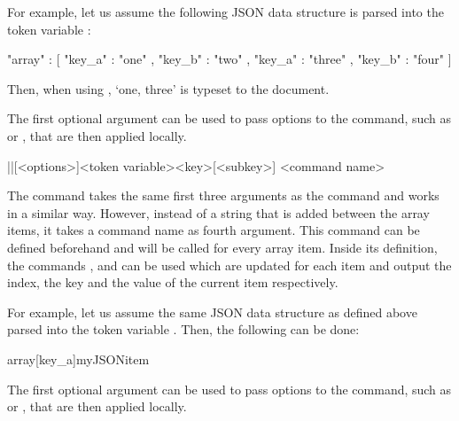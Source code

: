 \documentclass[a4paper]{article}
\begin{document}
{{For example, let us assume the following JSON data structure is parsed into the token variable \macro{\myJSONdata}:

\begin{codeexample}
{
  "array" : [
    {
      "key_a" : "one" ,
      "key_b" : "two"
    } ,
    {
      "key_a" : "three" ,
      "key_b" : "four"
    }
  ]
}
\end{codeexample}

Then, when using , `one, three' is typeset to the document. 

The first optional argument can be used to pass options to the command, such as  or , that are then applied locally. 

\begin{macrodef}
|\JSONParseArrayValuesMap|[<options>]{<token variable>}{<key>}[<subkey>]
    {<command name>}
\end{macrodef}
The command \macro{\JSONParseArrayValuesMap} takes the same first three arguments as the command \macro{\JSONParseArrayValues} and works in a similar way. However, instead of a string that is added between the array items, it takes a command name as fourth argument. This command can be defined beforehand and will be called for every array item. Inside its definition, the commands \macro{\JSONParseArrayIndex}, \macro{\JSONParseArrayKey} and \macro{\JSONParseArrayValue} can be used which are updated for each item and output the index, the key and the value of the current item respectively. 

For example, let us assume the same JSON data structure as defined above parsed into the token variable \macro{\myJSONdata}. Then, the following can be done:


\begin{codeexamplecolumns}
\newcommand{\myJSONitem}{
  \item \emph{\JSONParseArrayValue}
}

\begin{itemize}
  \JSONParseArrayValuesMap{\myJSONdata}
    {array}[key_a]{myJSONitem}
\end{itemize}
\end{codeexamplecolumns}

The first optional argument can be used to pass options to the command, such as  or , that are then applied locally. 

}}
\end{document}
